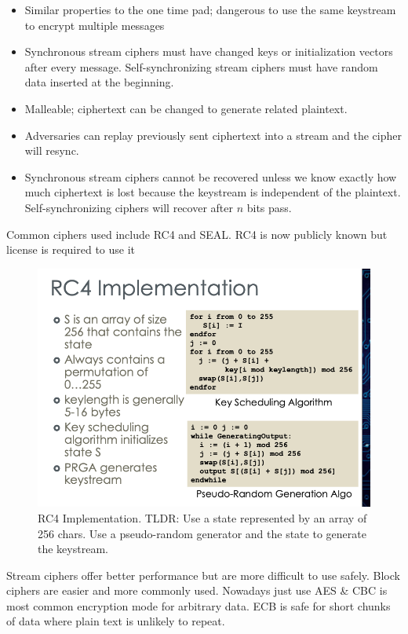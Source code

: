 \documentclass[../notes.tex]{subfiles}
\begin{document}
\begin{itemize}
\begin{figure}[H]
        \end{figure}
    \item Similar properties to the one time pad; dangerous to use the same keystream to encrypt multiple messages
    \item Synchronous stream ciphers must have changed keys or initialization vectors after every message. Self-synchronizing stream ciphers must have random data inserted at the beginning.
    \item Malleable; ciphertext can be changed to generate related plaintext.
    \item Adversaries can replay previously sent ciphertext into a stream and the cipher will resync.
    \item Synchronous stream ciphers cannot be recovered unless we know exactly how much ciphertext is lost because the keystream is independent of the plaintext.
        Self-synchronizing ciphers will recover after $ n $ bits pass.
\end{itemize}

Common ciphers used include RC4 and SEAL. 
RC4 is now publicly known but license is required to use it

\begin{figure}[H]
    \centering
    \includegraphics[width=0.8\linewidth]{img/image_2023-02-10-01-42-54.png}
    \caption{RC4 Implementation. TLDR: Use a state represented by an array of 256 chars. Use a pseudo-random generator and the state to generate the keystream.}
\end{figure}


Stream ciphers offer better performance but are more difficult to use safely. Block ciphers are easier and more commonly used. Nowadays just use AES \& CBC is most common encryption mode for arbitrary data. ECB is safe for short chunks of data where plain text is unlikely to repeat.
\end{document}
